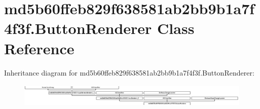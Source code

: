 \hypertarget{classmd5b60ffeb829f638581ab2bb9b1a7f4f3f_1_1ButtonRenderer}{}\section{md5b60ffeb829f638581ab2bb9b1a7f4f3f.\+Button\+Renderer Class Reference}
\label{classmd5b60ffeb829f638581ab2bb9b1a7f4f3f_1_1ButtonRenderer}
Inheritance diagram for md5b60ffeb829f638581ab2bb9b1a7f4f3f.\+Button\+Renderer\+:\begin{figure}[H]
\begin{center}
\leavevmode
\includegraphics[height=1.122807cm]{classmd5b60ffeb829f638581ab2bb9b1a7f4f3f_1_1ButtonRenderer}
\end{center}
\end{figure}
